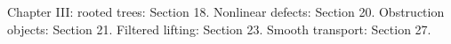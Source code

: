 {\small Chapter III: rooted trees: Section 18. Nonlinear defects: Section 20. Obstruction objects: Section 21. Filtered lifting: Section 23. Smooth transport: Section 27.\par}
